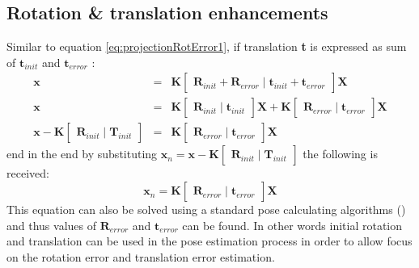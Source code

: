 \subsection{Rotation \& translation enhancements}
Similar to equation \ref{eq:projectionRotError1}, if translation \textbf{t} is expressed as sum of $\textbf{t}_{init}$ and $\textbf{t}_{error}$ :
\begin{equation} \label{eq:projectionRotError3}
\begin{array}{rcl}
 \textbf{x} & = & \textbf{K} \begin{bmatrix}\textbf{R}_{init} + \textbf{R}_{error}\mid \textbf{t}_{init} + \textbf{t}_{error}\end{bmatrix} \textbf{X} \\
 \textbf{x} & = & \textbf{K} \begin{bmatrix}\textbf{R}_{init}\mid \textbf{t}_{init}\end{bmatrix} \textbf{X} + \textbf{K} \begin{bmatrix}\textbf{R}_{error}\mid \textbf{t}_{error}\end{bmatrix} \textbf{X} \\
 \textbf{x} - \textbf{K} \begin{bmatrix}\textbf{R}_{init}\mid \textbf{T}_{init}\end{bmatrix} & = & \textbf{K} \begin{bmatrix}\textbf{R}_{error}\mid \textbf{t}_{error}\end{bmatrix} \textbf{X}
\end{array}
\end{equation}
end in the end by substituting $\textbf{x}_{n} = \textbf{x} - \textbf{K} \begin{bmatrix}\textbf{R}_{init}\mid \textbf{T}_{init}\end{bmatrix}$ the following is received: 
\begin{equation} \label{eq:projectionRotError4}
\textbf{x}_{n} = \textbf{K} \begin{bmatrix}\textbf{R}_{error}\mid \textbf{t}_{error}\end{bmatrix} \textbf{X}
\end{equation}
This equation can also be solved using a standard pose calculating algorithms (\cite{website:poseEstimation}) and thus values of $\textbf{R}_{error}$ and $\textbf{t}_{error}$ can be found. In other words initial rotation and translation can be used in the pose estimation process in order to allow focus on the rotation error and translation error estimation.
